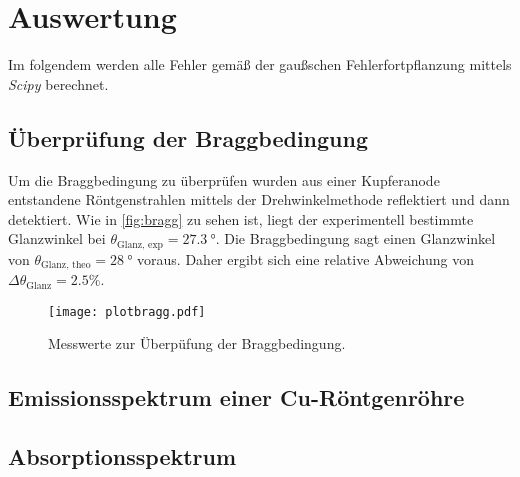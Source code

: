 \section{Auswertung}
\label{sec:Auswertung}
Im folgendem werden alle Fehler gemäß der gaußschen Fehlerfortpflanzung mittels \textit{Scipy}\cite{scipy} berechnet.
\subsection{Überprüfung der Braggbedingung}
\label{subsec:bragg}
Um die Braggbedingung zu überprüfen wurden aus einer Kupferanode entstandene Röntgenstrahlen mittels der Drehwinkelmethode reflektiert und dann detektiert. Wie in 
\autoref{fig:bragg} zu sehen ist, liegt der experimentell bestimmte Glanzwinkel bei $\theta_\text{Glanz, exp} = \qty{27.3}{\degree}$. Die Braggbedingung sagt einen 
Glanzwinkel von $\theta_\text{Glanz, theo} = \qty{28}{\degree}$ voraus. Daher ergibt sich eine relative Abweichung von $\Delta \theta_\text{Glanz} = 2.5\%$.
\begin{figure}
    \centering
    \texttt{[image: plotbragg.pdf]}
    \caption{Messwerte zur Überpüfung der Braggbedingung.}
    \label{fig:bragg}
\end{figure}

\subsection{Emissionsspektrum einer Cu-Röntgenröhre}
\label{subsec:emission}



\subsection{Absorptionsspektrum}
\label{subsec:absorption}
